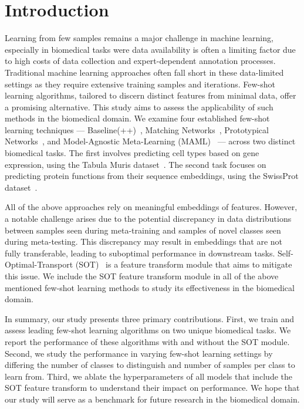 \section{Introduction}

Learning from few samples remains a major challenge in machine learning, especially in biomedical tasks were data availability is often a limiting factor due to high costs of data collection and expert-dependent annotation processes. Traditional machine learning approaches often fall short in these data-limited settings as they require extensive training samples and iterations. 
Few-shot learning algorithms, tailored to discern distinct features from minimal data, offer a promising alternative. 
This study aims to assess the applicability of such methods in the biomedical domain. We examine four established few-shot learning techniques — Baseline(++)~\cite{baseline}, 
Matching Networks~\cite{matchingnet}, Prototypical Networks~\cite{protonet}, and Model-Agnostic Meta-Learning (MAML)~\cite{maml} — across two distinct biomedical tasks. 
The first involves predicting cell types based on gene expression, using the Tabula Muris dataset~\cite{tabula2018}. The second task focuses on predicting protein functions 
from their sequence embeddings, using the SwissProt dataset~\cite{uniprot2019}.

All of the above approaches rely on meaningful embeddings of features. However, a notable challenge arises due to the potential discrepancy in data 
distributions between samples seen during meta-training and samples of novel classes seen during meta-testing. This discrepancy may result in embeddings that are 
not fully transferable, leading to suboptimal performance in downstream tasks. Self-Optimal-Transport (SOT)~\cite{sot} is a feature transform module that aims to mitigate this issue. We include the SOT feature transform module in all of the above mentioned few-shot learning methods to 
study its effectiveness in the biomedical domain.

In summary, our study presents three primary contributions. First, we train and assess leading few-shot learning algorithms on two unique biomedical tasks. We report the performance of these algorithms with and without the SOT module. 
Second, we study the performance in varying few-shot learning settings by differing the number of classes to distinguish and number of samples per class to learn from.
Third, we ablate the hyperparameters of all models that include the SOT feature transform to understand their impact on performance. We hope that our study will serve as a benchmark for future research in the biomedical domain.


